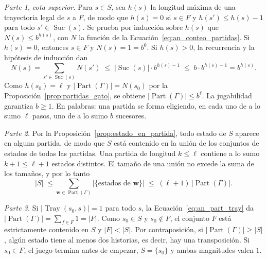 \emph{Parte 1, cota superior.} Para $s \in S$, sea $h(s)$ la longitud máxima de una trayectoria legal de $s$ a $F$, de modo que $h(s) = 0$ si $s \in F$ y $h(s') \le h(s) - 1$ para todo $s' \in \operatorname{Suc}(s)$. Se prueba por inducción sobre $h(s)$ que $N(s) \le b^{h(s)}$, con $N$ la función de la Ecuación~\eqref{eq:an_conteo_partidas}. Si $h(s) = 0$, entonces $s \in F$ y $N(s) = 1 = b^0$. Si $h(s) > 0$, la recurrencia y la hipótesis de inducción dan
\begin{equation*}
    N(s) = \sum_{s' \in \operatorname{Suc}(s)} N(s') \;\le\; |\operatorname{Suc}(s)| \cdot b^{h(s) - 1} \;\le\; b \cdot b^{h(s)-1} = b^{h(s)}.
\end{equation*}
Como $h(s_0) = \ell$ y $|\operatorname{Part}(\Gamma)| = N(s_0)$ por la Proposición~\ref{prop:partidas_gato}, se obtiene $|\operatorname{Part}(\Gamma)| \le b^{\ell}$. La jugabilidad garantiza $b \ge 1$. En palabras: una partida se forma eligiendo, en cada uno de a lo sumo $\ell$ pasos, uno de a lo sumo $b$ sucesores.

\emph{Parte 2.} Por la Proposición~\ref{prop:estado_en_partida}, todo estado de $S$ aparece en alguna partida, de modo que $S$ está contenido en la unión de los conjuntos de estados de todas las partidas. Una partida de longitud $k \le \ell$ contiene a lo sumo $k + 1 \le \ell + 1$ estados distintos. El tamaño de una unión no excede la suma de los tamaños, y por lo tanto
\begin{equation*}
    |S| \;\le \sum_{\mathbf w \in \operatorname{Part}(\Gamma)} \big|\{\text{estados de } \mathbf w\}\big| \;\le\; (\ell + 1)\, |\operatorname{Part}(\Gamma)|.
\end{equation*}

\emph{Parte 3.} Si $|\operatorname{Tray}(s_0, s)| = 1$ para todo $s$, la Ecuación~\eqref{eq:an_part_tray} da $|\operatorname{Part}(\Gamma)| = \sum_{f \in F} 1 = |F|$. Como $s_0 \in S$ y $s_0 \notin F$, el conjunto $F$ está estrictamente contenido en $S$ y $|F| < |S|$. Por contraposición, si $|\operatorname{Part}(\Gamma)| \ge |S|$, algún estado tiene al menos dos historias, es decir, hay una transposición. Si $s_0 \in F$, el juego termina antes de empezar, $S = \{s_0\}$ y ambas magnitudes valen $1$.

